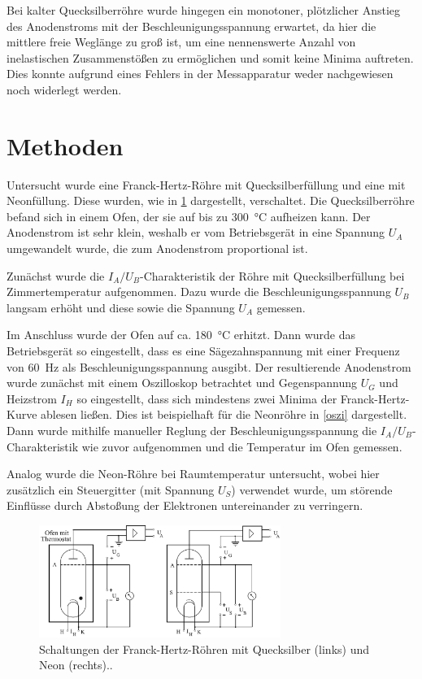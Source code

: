 \documentclass[
	a4paper,
	12pt,
	pagesize,
	ngerman
]{scrartcl}
\begin{document}
	Bei kalter Quecksilberröhre wurde hingegen ein monotoner, plötzlicher Anstieg des Anodenstroms mit der Beschleunigungsspannung erwartet, da hier die mittlere freie Weglänge zu groß ist, um eine nennenswerte Anzahl von inelastischen Zusammenstößen zu ermöglichen und somit keine Minima auftreten.
	Dies konnte aufgrund eines Fehlers in der Messapparatur weder nachgewiesen noch widerlegt werden.
	
	\section{Methoden}
	Untersucht wurde eine Franck-Hertz-Röhre mit Quecksilberfüllung und eine mit Neonfüllung.
	Diese wurden, wie in  \cref{Roehren_Schaltung} dargestellt, verschaltet. 
	Die Quecksilberröhre befand sich in einem Ofen, der sie auf bis zu \SI{300}{\degreeCelsius} aufheizen kann.
	Der Anodenstrom ist sehr klein, weshalb er vom Betriebsgerät in eine Spannung $U_A$ umgewandelt wurde, die zum Anodenstrom proportional ist.
	
	Zunächst wurde die $I_A/U_B$-Charakteristik der Röhre mit Quecksilberfüllung bei Zimmertemperatur aufgenommen.
	Dazu wurde die Beschleunigungsspannung $U_B$ langsam erhöht und diese sowie die Spannung $U_A$ gemessen.
	
	Im Anschluss wurde der Ofen auf ca. \SI{180}{\degreeCelsius} erhitzt.
	Dann wurde das Betriebsgerät so eingestellt, dass es eine Sägezahnspannung mit einer Frequenz von \SI{60}{\hertz} als Beschleunigungsspannung ausgibt.
	Der resultierende Anodenstrom wurde zunächst mit einem Oszilloskop betrachtet und Gegenspannung $U_G$ und Heizstrom $I_H$ so eingestellt, dass sich mindestens zwei Minima der Franck-Hertz-Kurve ablesen ließen.
	Dies ist beispielhaft für die Neonröhre in \cref{oszi} dargestellt.
	Dann wurde mithilfe manueller Reglung der Beschleunigungsspannung die $I_A/U_B$-Charakteristik wie zuvor aufgenommen und die Temperatur im Ofen gemessen.
	
	Analog wurde die Neon-Röhre bei Raumtemperatur untersucht, wobei hier zusätzlich ein Steuergitter (mit Spannung $U_S$) verwendet wurde, um störende Einflüsse durch Abstoßung der Elektronen untereinander zu verringern. 
	
	\begin{figure}[H]
		\includegraphics[width=0.7\textwidth]{Roehren}
		\centering
		\caption{Schaltungen der Franck-Hertz-Röhren mit Quecksilber (links) und Neon (rechts).\cite{Roehren}. }
		\label{Roehren_Schaltung}
		\centering
	\end{figure}
	
\end{document}

